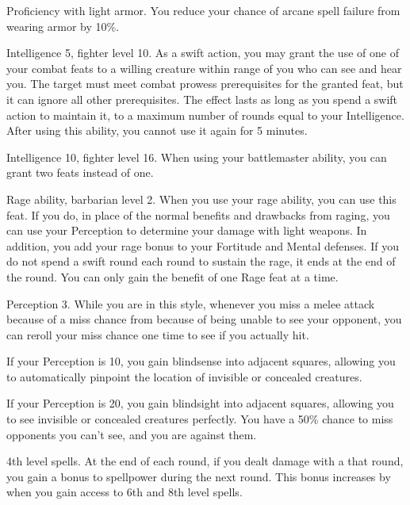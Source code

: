 \featpre Proficiency with light armor.
\featben You reduce your chance of arcane spell failure from wearing armor by 10\%.

\featpre Intelligence 5, fighter level 10.
\featben As a swift action, you may grant the use of one of your combat feats to a willing creature within \rngmed range of you who can see and hear you.
The target must meet combat prowess prerequisites for the granted feat, but it can ignore all other prerequisites.
The effect lasts as long as you spend a swift action to maintain it, to a maximum number of rounds equal to your Intelligence.
After using this ability, you cannot use it again for 5 minutes.

\featpre Intelligence 10, fighter level 16.
\featben When using your battlemaster ability, you can grant two feats instead of one.

\featpre Rage ability, barbarian level 2.
\featben When you use your rage ability, you can use this feat. If you do, in place of the normal benefits and drawbacks from raging, you can use your Perception to determine your damage with light weapons.
In addition, you add your rage bonus to your Fortitude and Mental defenses.
If you do not spend a swift round each round to sustain the rage, it ends at the end of the round.
 You can only gain the benefit of one Rage feat at a time.

\featpre Perception 3.
\featben While you are in this style, whenever you miss a melee attack because of a miss chance from because of being unable to see your opponent, you can reroll your miss chance one time to see if you actually hit.
\par If your Perception is 10, you gain blindsense into adjacent squares, allowing you to automatically pinpoint the location of invisible or concealed creatures.
\par If your Perception is 20, you gain blindsight into adjacent squares, allowing you to see invisible or concealed creatures perfectly.
You have a 50\% chance to miss opponents you can't see, and you are  against them.

\featpres 4th level spells.
\featben At the end of each round, if you dealt damage with a  that round, you gain a  bonus to spellpower during the next round.
This bonus increases by  when you gain access to 6th and 8th level spells.

